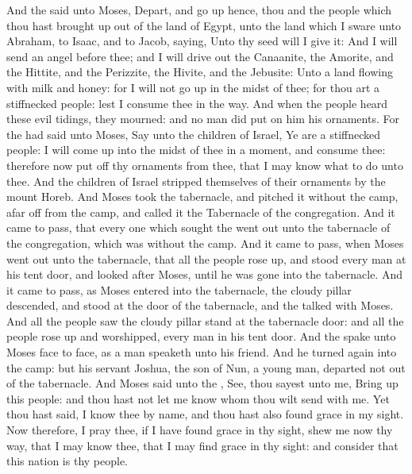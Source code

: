 \begin{biblechapter} %
\verse And the \LORD said unto Moses, Depart, and go up hence, thou and the people which thou hast brought up out of the land of Egypt, unto the land which I sware unto Abraham, to Isaac, and to Jacob, saying, Unto thy seed will I give it:
\verse And I will send an angel before thee; and I will drive out the Canaanite, the Amorite, and the Hittite, and the Perizzite, the Hivite, and the Jebusite:
\verse Unto a land flowing with milk and honey: for I will not go up in the midst of thee; for thou art a stiffnecked people: lest I consume thee in the way.
\verse And when the people heard these evil tidings, they mourned: and no man did put on him his ornaments.
\verse For the \LORD had said unto Moses, Say unto the children of Israel, Ye are a stiffnecked people: I will come up into the midst of thee in a moment, and consume thee: therefore now put off thy ornaments from thee, that I may know what to do unto thee.
\verse And the children of Israel stripped themselves of their ornaments by the mount Horeb.
 And Moses took the tabernacle, and pitched it without the camp, afar off from the camp, and called it the Tabernacle of the congregation. And it came to pass, that every one which sought the \LORD went out unto the tabernacle of the congregation, which was without the camp.
\verse And it came to pass, when Moses went out unto the tabernacle, that all the people rose up, and stood every man at his tent door, and looked after Moses, until he was gone into the tabernacle.
\verse And it came to pass, as Moses entered into the tabernacle, the cloudy pillar descended, and stood at the door of the tabernacle, and the \LORD talked with Moses.
\verse And all the people saw the cloudy pillar stand at the tabernacle door: and all the people rose up and worshipped, every man in his tent door.
\verse And the \LORD spake unto Moses face to face, as a man speaketh unto his friend. And he turned again into the camp: but his servant Joshua, the son of Nun, a young man, departed not out of the tabernacle.
 And Moses said unto the \LORD, See, thou sayest unto me, Bring up this people: and thou hast not let me know whom thou wilt send with me. Yet thou hast said, I know thee by name, and thou hast also found grace in my sight.
\verse Now therefore, I pray thee, if I have found grace in thy sight, shew me now thy way, that I may know thee, that I may find grace in thy sight: and consider that this nation is thy people.

\end{biblechapter}
